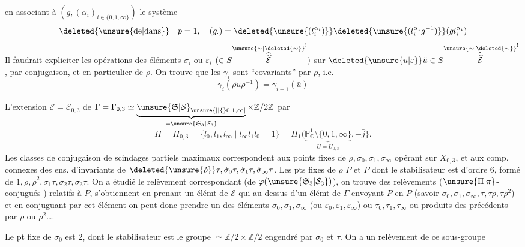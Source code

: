 en associant à $(g,(\alpha_i)_{i\in\{0,1,\infty\}})$ le système
\[
\deleted{\text{\unsure{de|dans}}}\quad p=1,\quad(g_\cdot)=\deleted{\unsure{(l_i^{\alpha_i})}}\deleted{\unsure{(l_i^{\alpha_i}g^{-1})}}(gl_i^{\alpha_i})
\]
Il faudrait expliciter les opérations des éléments $\sigma_i$ ou $\varepsilon_i$  $(\in S\overset{\unsure{\sim|\deleted{\sim}}}{\widehat{\widehat{\mathcal E}}}^{!})$ sur $\deleted{\unsure{u|\varepsilon}}\tilde u\in S\overset{\unsure{\sim|\deleted{\sim}}}{\widehat{\widehat{\mathcal E}}}^{!}$, par  conjugaison, et en particulier de $\rho$. On trouve que  les $\gamma_i$ sont ``covariants'' par $\rho$, i.e.
\[
\gamma_i(\rho\tilde u\rho^{-1})=\gamma_{i+1}(\bar u)
\]

L'extension $\mathcal E=\mathcal E_{0,3}$ de $\Gamma=\Gamma_{0,3}\simeq\underbrace{\unsure{\mathfrak S|\mathcal S}_{\unsure{[|\{}0,1,\infty]}}_{=\unsure{\mathfrak S_3|\mathcal S_3}}\times\mathbb Z/2\mathbb Z$
par
\[
\Pi=\Pi_{0,3}=\{l_0,l_1,l_\infty\mid l_\infty l_1l_0=1\}=\Pi_1(\underbrace{\mathbb P^1_{\mathbb C}\setminus\{0,1,\infty\}}_{U=U_{0,3}},-\bar j\}.
\]
Les classes de conjugaison  de scindages partiels maximaux correspondent aux points fixes de $\dot\rho,\dot\sigma_0,\dot\sigma_1,\dot\sigma_\infty$ opérant sur $X_{0,3}$, et  aux comp. connexes des ens. d'invariants de $\deleted{\unsure{\dot\rho}}\tau,\dot\sigma_0\tau,\dot\sigma_1\tau,\dot\sigma_\infty\tau$. Les pts fixes de $\rho$  $P$ et $\bar P$ dont le stabilisateur est d'ordre $6$,  formé de $1,\dot\rho,\dot\rho^2,\dot\sigma_1\tau,\dot\sigma_2\tau,\dot\sigma_3\tau$. On a étudié le relèvement correspondant  (de $\varphi(\unsure{\mathfrak S_3|\mathcal S_3})$), on trouve des relèvements ($\unsure{\Pi|\pi}$-conjugués ) relatifs à $\bar P$, s'obtiennent en  prenant un élémt de $\mathcal E$  qui  au dessus d'un élémt de $\Gamma$ envoyant $P$ en $\bar P$ (savoir $\dot\sigma_0,\dot\sigma_1,\dot\sigma_\infty,\tau,\tau\rho,\tau\rho^2$) et en conjuguant par cet élément on peut donc prendre  un des éléments $\sigma_0,\sigma_1,\sigma_\infty$ (ou $\varepsilon_0,\varepsilon_1,\varepsilon_\infty$) ou $\tau_0,\tau_1,\tau_\infty$ ou  produits des précédents par \deleted{\unsure{$\tau$}} $\rho$ ou $\rho^2$\ldots.

Le  pt fixe de $\sigma_0$ est $2$, dont le stabilisateur est le groupe $\simeq\mathbb Z/2\times\mathbb Z/2$ engendré par $\sigma_0$ et $\tau$. On a un relèvement de ce sous-groupe
